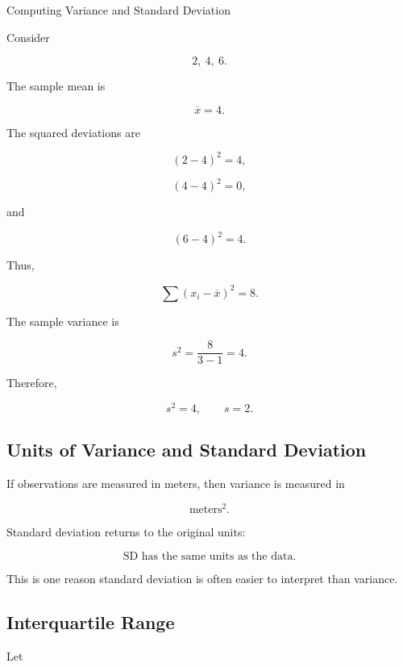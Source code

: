 \begin{workedexamplebox}{Computing Variance and Standard Deviation}

Consider

\[
2,\ 4,\ 6.
\]

The sample mean is

\[
\overline{x}=4.
\]

The squared deviations are

\[
(2-4)^2=4,
\]

\[
(4-4)^2=0,
\]

and

\[
(6-4)^2=4.
\]

Thus,

\[
\sum
(x_i-\overline{x})^2
=
8.
\]

The sample variance is

\[
s^2
=
\frac8{3-1}
=
4.
\]

Therefore,

\begin{answerbox}
\[
\boxed{
s^2=4,
\qquad
s=2.
}
\]
\end{answerbox}

\end{workedexamplebox}

\subsection{Units of Variance and Standard Deviation}
\label{subsec:variance-units}

If observations are measured in meters, then variance is measured in

\[
\text{meters}^2.
\]

Standard deviation returns to the original units:

\[
\boxed{
\text{SD has the same units as the data}.
}
\]

This is one reason standard deviation is often easier to interpret than
variance.

\subsection{Interquartile Range}
\label{subsec:interquartile-range}

Let


